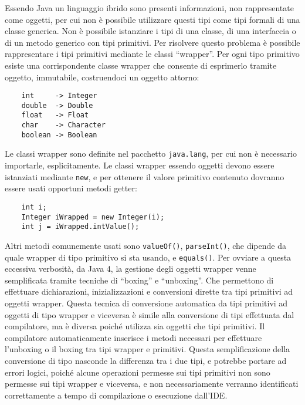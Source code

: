 \documentclass{article}
\numberwithin{equation}{subsection}
\begin{document}
Essendo Java un linguaggio ibrido sono presenti informazioni, non rappresentate come oggetti, per cui non è possibile utilizzare questi tipi come tipi formali di una classe 
generica. Non è possibile istanziare i tipi di una classe, di una interfaccia o di un metodo generico con tipi primitivi. Per risolvere questo problema è possibile 
rappresentare i tipi primitivi mediante le classi ``wrapper''. Per ogni tipo primitivo esiste una corrispondente classe wrapper che consente di esprimerlo tramite oggetto, 
immutabile, costruendoci un oggetto attorno:
\begin{verbatim}
    int     -> Integer
    double  -> Double
    float   -> Float
    char    -> Character
    boolean -> Boolean
\end{verbatim}

Le classi wrapper sono definite nel pacchetto \verb|java.lang|, per cui non è necessario importarle, esplicitamente. Le classi wrapper essendo oggetti devono essere istanziati mediante 
\verb|new|, e per ottenere il valore primitivo contenuto dovranno essere usati opportuni metodi getter:
\begin{verbatim}
    int i;
    Integer iWrapped = new Integer(i);
    int j = iWrapped.intValue();
\end{verbatim}
Altri metodi comunemente usati sono \verb|valueOf()|, \verb|parseInt()|, che dipende da quale wrapper di tipo primitivo si sta usando, e \verb|equals()|. 
Per ovviare a questa eccessiva verbosità, da 
Java 4, la gestione degli oggetti wrapper venne semplificata tramite tecniche di ``boxing'' e ``unboxing''. Che permettono di effettuare dichiarazioni, inizializzazioni e 
conversioni dirette tra tipi primitivi ad oggetti wrapper. Questa tecnica di conversione automatica da tipi primitivi ad oggetti di tipo wrapper e viceversa è simile alla conversione di tipi 
effettuata dal compilatore, ma è diversa poiché utilizza sia oggetti che tipi primitivi. Il compilatore automaticamente inserisce i metodi necessari per effettuare l'unboxing o il 
boxing tra tipi wrapper e primitivi. 
Questa semplificazione della conversione di tipo nasconde la differenza tra i due tipi, e potrebbe portare ad errori logici, poiché alcune operazioni permesse sui tipi primitivi non 
sono permesse sui tipi wrapper e viceversa, e non necessariamente verranno identificati correttamente a tempo di compilazione o esecuzione dall'IDE. 
\end{document}
